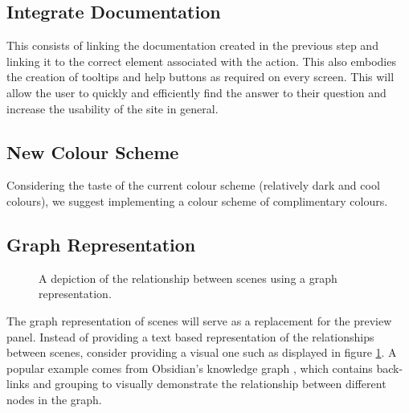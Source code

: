 \documentclass[sigconf]{acmart}
\begin{document}
\subsection{Integrate Documentation}
This consists of linking the documentation created in the previous step and linking it to the correct element associated with the action. This also embodies the creation of tooltips and help buttons as required on every screen. This will allow the user to quickly and efficiently find the answer to their question and increase the usability of the site in general.

\subsection{New Colour Scheme}
Considering the taste of the current colour scheme (relatively dark and cool colours), we suggest implementing a colour scheme of complimentary colours.

\subsection{Graph Representation}
\begin{figure}
\caption{A depiction of the relationship between scenes using a graph representation.}\label{fig:scene_graph}
\end{figure}
The graph representation of scenes will serve as a replacement for the preview panel. Instead of providing a text based representation of the relationships between scenes, consider providing a visual one such as displayed in figure \ref{fig:scene_graph}. A popular example comes from Obsidian's knowledge graph \cite{Obsidian}, which contains back-links and grouping to visually demonstrate the relationship between different nodes in the graph.
\end{document}
